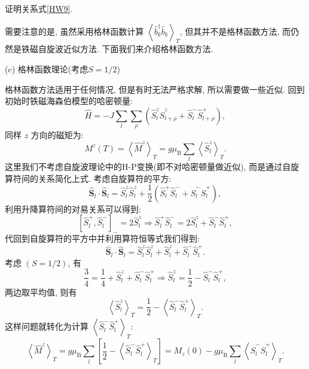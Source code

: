 \begin{question}{}{}
证明关系式\eqref{HW9}.
\end{question}


需要注意的是, 虽然采用格林函数计算 $\displaystyle\left\langle\hat{b}_{k}^{\dagger} \hat{b}^{}_{k}\right\rangle_{T}$, 但其并不是格林函数方法, 而仍然是铁磁自旋波近似方法. 下面我们来介绍格林函数方法.

(c) 格林函数理论(考虑$S=1/2$)

格林函数方法适用于任何情况, 但是有时无法严格求解, 所以需要做一些近似. 回到初始时铁磁海森伯模型的哈密顿量:
\begin{equation}
\hat{H}=-J \sum_{l} \sum_{\rho}\left(\hat{S}_{l}^{z} \hat{S}_{l+\rho}^{z}+\hat{S}_{l}^{-} \hat{S}_{l+\rho}^{+}\right) ,
\end{equation}
同样 $z$ 方向的磁矩为:
\begin{equation}
M^{z}(T)=\left\langle\hat{M}^{z}\right\rangle_{T}=g \mu_\mathrm{B} \sum_{l}\left\langle\hat{S}_{l}^{z}\right\rangle_{T}.
\end{equation}
这里我们不考虑自旋波理论中的H-P变换(即不对哈密顿量做近似), 而是通过自旋算符间的关系简化上式. 考虑自旋算符的平方:
\begin{equation}
\hat{\boldsymbol{S}}_{l} \cdot \hat{\boldsymbol{S}}_{l}=\hat{S}_{l}^{z} \hat{S}_{l}^{z}+\frac{1}{2}\left(\hat{S}_{l}^{+} \hat{S}_{l}^{-}+\hat{S}_{l}^{-} \hat{S}_{l}^{+}\right),
\end{equation}
利用升降算符间的对易关系可以得到:
\begin{equation}
\left[\hat{S}_{l}^{+}, \hat{S}_{l}^{-}\right]_{-}=2 \hat{S}_{l}^{z} \Rightarrow \hat{S}_{l}^{+} \hat{S}_{l}^{-}=2 \hat{S}_{l}^{z}+\hat{S}_{l}^{-} \hat{S}_{l}^{+},
\end{equation}
代回到自旋算符的平方中并利用算符恒等式我们得到:
\begin{equation}
\hat{\boldsymbol{S}}_{l} \cdot \hat{\boldsymbol{S}}_{l} =\hat{S}_{l}^{z} \hat{S}_{l}^{z}+\hat{S}_{l}^{z}+\hat{S}_{l}^{-} \hat{S}_{l}^{+}.
\end{equation}
考虑 $(S=1 / 2)$, 有
\begin{equation}
\frac{3}{4} =\frac{1}{4}+\hat{S}_{l}^{z}+\hat{S}_{l}^{-} \hat{S}_{l}^{+} \Rightarrow \hat{S}_{l}^{z} =\frac{1}{2}-\hat{S}_{l}^{-} \hat{S}_{l}^{+} ,
\end{equation}
两边取平均值, 则有
\begin{equation}
\left\langle\hat{S}_{l}^{z}\right\rangle_{T} =\frac{1}{2}-\left\langle\hat{S}_{l}^{-} \hat{S}_{l}^{+}\right\rangle_{T}.
\end{equation}
这样问题就转化为计算 $\left\langle\hat{S}_{l}^{-} \hat{S}_{l}^{+}\right\rangle_{T}$:
\begin{equation}
\left\langle\hat{M}^{z}\right\rangle_{T}=g \mu_\mathrm{B} \sum_{l}\left[\frac{1}{2}-\left\langle\hat{S}_{l}^{-} \hat{S}_{l}^{+}\right\rangle_{T}\right]=M_z(0)-g \mu_\mathrm{B} \sum_{l}\left\langle\hat{S}_{l}^{-} \hat{S}_{l}^{+}\right\rangle_{T}.
\end{equation}

